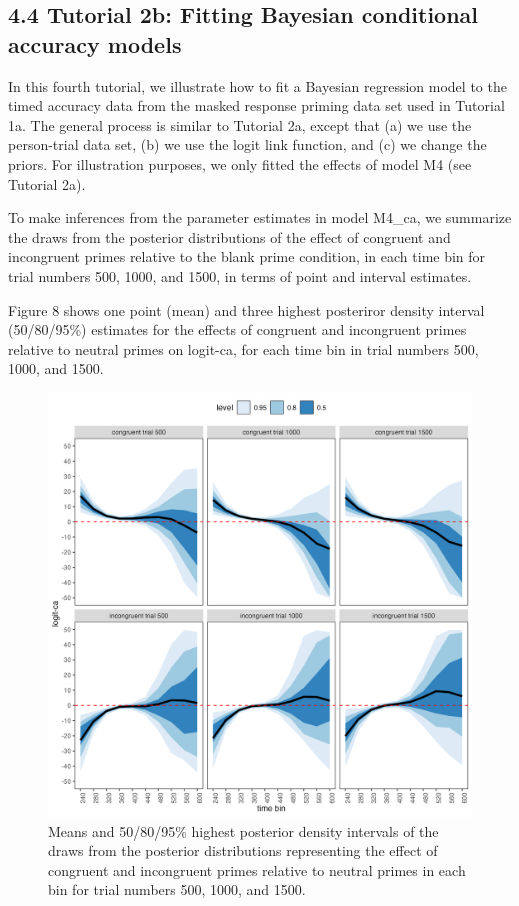 \documentclass[
  man,floatsintext]{apa6}
\begin{document}
\subsection{4.4 Tutorial 2b: Fitting Bayesian conditional accuracy models}\label{tutorial-2b-fitting-bayesian-conditional-accuracy-models}

In this fourth tutorial, we illustrate how to fit a Bayesian regression model to the timed accuracy data from the masked response priming data set used in Tutorial 1a. The general process is similar to Tutorial 2a, except that (a) we use the person-trial data set, (b) we use the logit link function, and (c) we change the priors. For illustration purposes, we only fitted the effects of model M4 (see Tutorial 2a).

To make inferences from the parameter estimates in model M4\_ca, we summarize the draws from the posterior distributions of the effect of congruent and incongruent primes relative to the blank prime condition, in each time bin for trial numbers 500, 1000, and 1500, in terms of point and interval estimates.

Figure 8 shows one point (mean) and three highest posteriror density interval (50/80/95\%) estimates for the effects of congruent and incongruent primes relative to neutral primes on logit-ca, for each time bin in trial numbers 500, 1000, and 1500.



\begin{figure}[H]

{\centering \includegraphics[width=0.8\linewidth,height=0.67\textheight,]{../Tutorial_2_Bayesian/figures/M4_ca_effects_con_incon_3trials} 

}

\caption{Means and 50/80/95\% highest posterior density intervals of the draws from the posterior distributions representing the effect of congruent and incongruent primes relative to neutral primes in each bin for trial numbers 500, 1000, and 1500.}\label{fig:plot-prime-ca-effects}
\end{figure}
\end{document}
